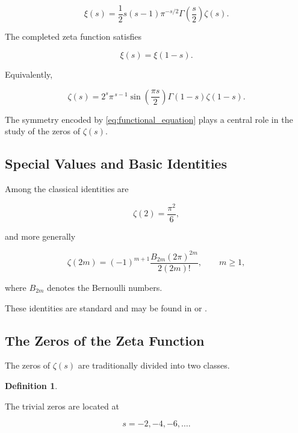 \documentclass[11pt]{amsart}
\numberwithin{equation}{section}
\theoremstyle{plain}
\theoremstyle{definition}
\newtheorem{definition}[theorem]{Definition}
\theoremstyle{remark}
\begin{document}
\begin{equation}
\xi(s)
=
\frac12
s(s-1)
\pi^{-s/2}
\Gamma\!\left(\frac{s}{2}\right)
\zeta(s).
\label{eq:xi_definition}
\end{equation}

The completed zeta function satisfies

\begin{equation}
\xi(s)
=
\xi(1-s).
\label{eq:functional_equation}
\end{equation}

Equivalently,

\begin{equation}
\zeta(s)
=
2^{s}
\pi^{\,s-1}
\sin\!\left(\frac{\pi s}{2}\right)
\Gamma(1-s)
\zeta(1-s).
\label{eq:functional_equation_zeta}
\end{equation}

The symmetry encoded by
\eqref{eq:functional_equation}
plays a central role in the study of the zeros of
$\zeta(s)$.

\subsection{Special Values and Basic Identities}
\label{subsec:special_values}

Among the classical identities are

\begin{equation}
\zeta(2)
=
\frac{\pi^{2}}{6},
\label{eq:zeta2}
\end{equation}

and more generally

\begin{equation}
\zeta(2m)
=
(-1)^{m+1}
\frac{B_{2m}(2\pi)^{2m}}
{2(2m)!},
\qquad
m\ge 1,
\label{eq:zeta_even_values}
\end{equation}

where
$B_{2m}$
denotes the Bernoulli numbers.

These identities are standard and may be found in
\cite{Titchmarsh1986}
or
\cite{Edwards2001}.

\subsection{The Zeros of the Zeta Function}
\label{subsec:zeta_zeros}

The zeros of
$\zeta(s)$
are traditionally divided into two classes.

\begin{definition}
\label{def:trivial_zeros}

The trivial zeros are located at

\begin{equation}
s=-2,-4,-6,\ldots.
\label{eq:trivial_zeros}
\end{equation}

\end{definition}
\end{document}

